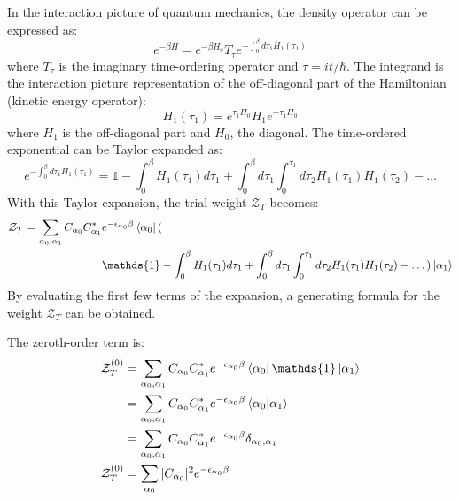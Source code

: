 \documentclass[12pt, two sided]{article}
\begin{document}
In the interaction picture of quantum mechanics, the density operator can be expressed as:
%
\begin{equation}
\label{eq:density_op_01}
e^{-\beta H} = e^{-\beta H_0} T_{\tau} e^{- \int_0^{\beta} d\tau_1 H_1(\tau_1)}
\end{equation}
where $T_{\tau}$ is the imaginary time-ordering operator and $\tau = it/\hbar$. The integrand is the interaction picture representation of the off-diagonal part of the Hamiltonian (kinetic energy operator):
%
\begin{equation}
H_1(\tau_1) = e^{\tau_1 H_0} H_1 e^{-\tau_1 H_0}
\end{equation}
%
where $H_1$ is the off-diagonal part and $H_0$, the diagonal. The time-ordered exponential can be Taylor expanded as:
\begin{equation}
e^{- \int_0^{\beta} d\tau_1 H_1(\tau_1)} = \mathds{1} - \int_{0}^{\beta} H_1(\tau_1) d\tau_1 + \int_0^{\beta} d\tau_1 \int_{0}^{\tau_1} d\tau_2 H_1(\tau_1) H_1(\tau_2) - \dots 
\end{equation}
%
With this Taylor expansion, the trial weight $\mathcal{Z}_T$ becomes:
%
\begin{equation}
\begin{aligned}
\mathcal{Z_T} = \sum_{\alpha_0, \alpha_1} C_{\alpha_0} C_{\alpha_1}^{*} &e^{-\epsilon_{\alpha_0} \beta}  \bra{\alpha_0} ( \\
& \mathds{1} - \int_{0}^{\beta} H_1(\tau_1) d\tau_1 + \int_0^{\beta} d\tau_1 \int_{0}^{\tau_1} d\tau_2 H_1(\tau_1) H_1(\tau_2) - \dots ) \ket{\alpha_1}
\end{aligned}
\end{equation}
%
By evaluating the first few terms of the expansion, a generating formula for the weight $\mathcal{Z}_T$ can be obtained. 

The zeroth-order term is:
\begin{equation}
\begin{aligned}
\mathcal{Z}_T^{(0)} &= \sum_{\alpha_0, \alpha_1} C_{\alpha_0} C_{\alpha_1}^{*} e^{-\epsilon_{\alpha_0} \beta}  \bra{\alpha_0} \mathds{1} \ket{\alpha_1} \\
&= \sum_{\alpha_0, \alpha_1} C_{\alpha_0} C_{\alpha_1}^{*} e^{-\epsilon_{\alpha_0} \beta}  \bra{\alpha_0} \ket{\alpha_1} \\
&= \sum_{\alpha_0, \alpha_1} C_{\alpha_0} C_{\alpha_1}^{*} e^{-\epsilon_{\alpha_0} \beta} \delta_{\alpha_0,\alpha_1} \\
\mathcal{Z}_T^{(0)}  &= \sum_{\alpha_0} \vert C_{\alpha_0} \vert^2 e^{-\epsilon_{\alpha_0} \beta}
\end{aligned}
\end{equation}
\end{document}
